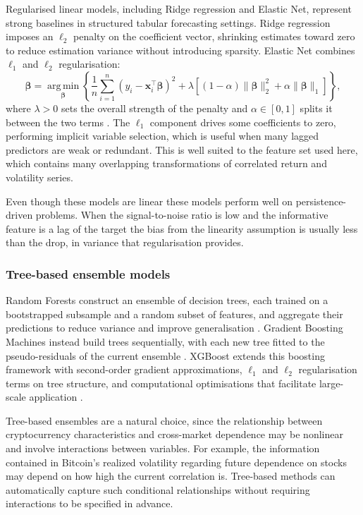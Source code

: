 Regularised linear models, including Ridge regression and Elastic Net, represent strong baselines in structured tabular forecasting settings. Ridge regression imposes an $\ell_2$ penalty on the coefficient vector, shrinking estimates toward zero to reduce estimation variance without introducing sparsity. Elastic Net combines $\ell_1$ and $\ell_2$ regularisation:
\begin{equation}
    \hat{\boldsymbol{\beta}} = \operatorname*{arg\,min}_{\boldsymbol{\beta}} \left\{
        \frac{1}{n}\sum_{i=1}^{n}(y_i - \mathbf{x}_i^{\top}\boldsymbol{\beta})^2
        + \lambda \left[(1-\alpha)\|\boldsymbol{\beta}\|_2^2 + \alpha\|\boldsymbol{\beta}\|_1\right]
    \right\},
\end{equation}
where $\lambda > 0$ sets the overall strength of the penalty and $\alpha \in [0,1]$ splits it between the two terms \cite{zou2005}. The $\ell_1$ component drives some coefficients to zero, performing implicit variable selection, which is useful when many lagged predictors are weak or redundant. This is well suited to the feature set used here, which contains many overlapping transformations of correlated return and volatility series.

Even though these models are linear these models perform well on persistence-driven problems. When the signal-to-noise ratio is low and the informative feature is a lag of the target the bias from the linearity assumption is usually less than the drop, in variance that regularisation provides.

\subsubsection{Tree-based ensemble models}

Random Forests construct an ensemble of decision trees, each trained on a bootstrapped subsample and a random subset of features, and aggregate their predictions to reduce variance and improve generalisation \cite{breiman2001}. Gradient Boosting Machines instead build trees sequentially, with each new tree fitted to the pseudo-residuals of the current ensemble \cite{friedman2001}. XGBoost extends this boosting framework with second-order gradient approximations, $\ell_1$ and $\ell_2$ regularisation terms on tree structure, and computational optimisations that facilitate large-scale application \cite{chen2016}.

Tree-based ensembles are a natural choice, since the relationship between cryptocurrency characteristics and cross-market dependence may be nonlinear and involve interactions between variables. For example, the information contained in Bitcoin's realized volatility regarding future dependence on stocks may depend on how high the current correlation is. Tree-based methods can automatically capture such conditional relationships without requiring interactions to be specified in advance.

